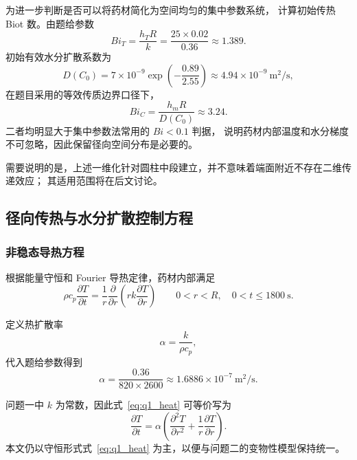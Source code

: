 \documentclass[UTF8,a4paper,12pt]{ctexart}
\begin{document}
为进一步判断是否可以将药材简化为空间均匀的集中参数系统，
计算初始传热 Biot 数。由题给参数
\begin{equation}
Bi_T=\frac{h_TR}{k}
=\frac{25\times0.02}{0.36}
\approx1.389.
\end{equation}
初始有效水分扩散系数为
\begin{equation}
D(C_0)
=
7\times10^{-9}\exp\left(-\frac{0.89}{2.55}\right)
\approx4.94\times10^{-9}\ \mathrm{m^2/s},
\end{equation}
在题目采用的等效传质边界口径下，
\begin{equation}
Bi_C=\frac{h_mR}{D(C_0)}
\approx3.24.
\end{equation}
二者均明显大于集中参数法常用的 $Bi<0.1$ 判据，
说明药材内部温度和水分梯度不可忽略，因此保留径向空间分布是必要的。

需要说明的是，上述一维化针对圆柱中段建立，并不意味着端面附近不存在二维传递效应；
其适用范围将在后文讨论。

\subsection{径向传热与水分扩散控制方程}

\subsubsection{非稳态导热方程}

根据能量守恒和 Fourier 导热定律，药材内部满足
\begin{equation}
\boxed{
\rho c_p\frac{\partial T}{\partial t}
=
\frac{1}{r}
\frac{\partial}{\partial r}
\left(
rk\frac{\partial T}{\partial r}
\right)
}
\qquad
0<r<R,\quad 0<t\le1800~\mathrm{s}.
\label{eq:q1_heat}
\end{equation}

定义热扩散率
\begin{equation}
\alpha=\frac{k}{\rho c_p},
\end{equation}
代入题给参数得到
\begin{equation}
\alpha
=
\frac{0.36}{820\times2600}
\approx1.6886\times10^{-7}\ \mathrm{m^2/s}.
\end{equation}

问题一中 $k$ 为常数，因此式~\eqref{eq:q1_heat} 可等价写为
\begin{equation}
\frac{\partial T}{\partial t}
=
\alpha
\left(
\frac{\partial^2T}{\partial r^2}
+
\frac1r\frac{\partial T}{\partial r}
\right).
\end{equation}
本文仍以守恒形式式~\eqref{eq:q1_heat} 为主，以便与问题二的变物性模型保持统一。
\end{document}
